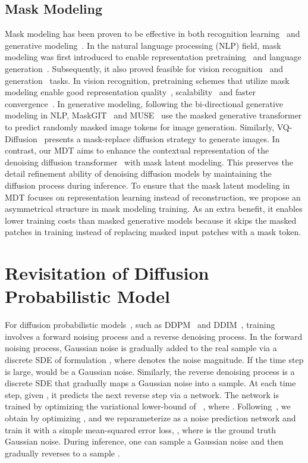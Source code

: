\documentclass[final]{cvpr}
\begin{document}
\subsection{Mask Modeling}
Mask modeling
has been proven to be effective in both recognition learning~\cite{devlin2018bert,he2022masked,gao2022towards} 
and generative modeling~\cite{radford2018improving,chang2022maskgit}.
In the natural language processing (NLP) field, 
mask modeling was first introduced to
enable representation pretraining~\cite{devlin2018bert,radford2018improving}
and language generation~\cite{brown2020language}.
Subsequently,
it also proved feasible for 
vision recognition~\cite{bao2021beit} and generation~\cite{zhang2021m6,chang2022maskgit,gu2022vector} tasks.
In vision recognition,
pretraining schemes that utilize mask modeling
enable good representation quality~\cite{zhou2021ibot}, scalability~\cite{he2022masked} 
and faster convergence~\cite{gao2022towards}.
In generative modeling,
following the bi-directional generative modeling in NLP,
MaskGIT~\cite{chang2022maskgit} and MUSE~\cite{chang2023muse} 
use the masked generative
transformer to predict randomly masked image tokens for image generation.
Similarly, VQ-Diffusion~\cite{gu2022vector} presents a mask-replace diffusion strategy
to generate images.
In contrast,
our MDT aims to enhance the contextual representation of the denoising diffusion
transformer~\cite{peebles2022scalable} with mask latent modeling.
This preserves the detail refinement ability of denoising diffusion models
by maintaining the diffusion process during inference.
To ensure that the mask latent modeling in MDT focuses on representation learning
instead of reconstruction, we propose an asymmetrical structure in mask modeling training.
As an extra benefit, it enables lower training costs than masked generative models
because it
skips the masked patches in training instead of replacing masked input patches with a mask token.




\section{Revisitation of Diffusion Probabilistic Model}
\label{sec:ddpm}
For diffusion probabilistic models~\cite{dhariwal2021diffusion,sohl2015deep}, 
such as DDPM~\cite{ho2020denoising} and DDIM~\cite{song2020denoising}, 
training involves a forward noising process and a reverse denoising process. 
In the forward noising process, Gaussian noise  is gradually added  
to the real sample  via a discrete SDE of formulation  ,
where  denotes the noise magnitude. If the time step  is large,  would be a Gaussian noise. Similarly, the reverse denoising process is a discrete SDE that gradually maps a Gaussian
noise into a sample. At each  time step, given , it predicts the next reverse step
 via a network.
The network is trained by
optimizing the variational lower-bound   of 
 ~\cite{sohl2015deep}, where 
  .
Following~\cite{nichol2021improved,peebles2022scalable},
we obtain  by optimizing ,
and we reparameterize  as a noise prediction network 
and train it with a simple mean-squared error loss, \ie ,
where  is the ground truth Gaussian noise.
During inference, one can sample  a Gaussian noise
and then gradually reverses to a sample .
\end{document}
